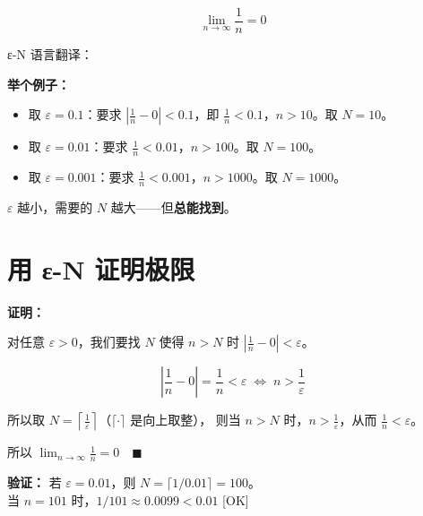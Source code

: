 \begin{examplebox}
\[
\lim_{n \to \infty} \frac{1}{n} = 0
\]

ε-N 语言翻译：

\begin{center}
\end{center}

\textbf{举个例子：}
\begin{itemize}
  \item 取 \(\varepsilon = 0.1\)：要求 \(|\frac{1}{n} - 0| < 0.1\)，即 \(\frac{1}{n} < 0.1\)，\(n > 10\)。取 \(N = 10\)。
  \item 取 \(\varepsilon = 0.01\)：要求 \(\frac{1}{n} < 0.01\)，\(n > 100\)。取 \(N = 100\)。
  \item 取 \(\varepsilon = 0.001\)：要求 \(\frac{1}{n} < 0.001\)，\(n > 1000\)。取 \(N = 1000\)。
\end{itemize}

\(\varepsilon\) 越小，需要的 \(N\) 越大——但\textbf{总能找到}。
\end{examplebox}


\section{用 ε-N 证明极限}

\begin{examplebox}[2——证明 1/n 趋于 0]
\textbf{证明：}

对任意 \(\varepsilon > 0\)，我们要找 \(N\) 使得 \(n > N\) 时 \(|\frac{1}{n} - 0| < \varepsilon\)。

\[
\left|\frac{1}{n} - 0\right| = \frac{1}{n} < \varepsilon \;\Longleftrightarrow\; n > \frac{1}{\varepsilon}
\]

所以取 \(N = \left\lceil \frac{1}{\varepsilon} \right\rceil\)（\(\lceil\cdot\rceil\) 是向上取整），
则当 \(n > N\) 时，\(n > \frac{1}{\varepsilon}\)，从而 \(\frac{1}{n} < \varepsilon\)。

所以 \(\displaystyle \lim_{n\to\infty} \frac{1}{n} = 0\quad\blacksquare\)

\textbf{验证：} 若 \(\varepsilon = 0.01\)，则 \(N = \lceil 1/0.01 \rceil = 100\)。\\
当 \(n = 101\) 时，\(1/101 \approx 0.0099 < 0.01\) [OK]
\end{examplebox}

